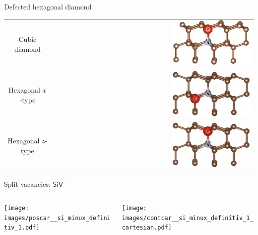 \documentclass[]{beamer}
\begin{document}
\begin{frame}{Defected hexagonal diamond}
  \begin{center}
    \begin{tabular}{cr}
      Cubic diamond   & \includegraphics[width=0.4\textwidth]{images/POSCAR_16_view.png}\\
      Hexagonal $ x $-type &\includegraphics[width=0.4\textwidth]{images/POSCAR_16_x_view.png}\\
      Hexagonal $ z $-type & \includegraphics[width=0.4\textwidth]{images/POSCAR_16_z_view.png}
    \end{tabular}
  \end{center}

\end{frame}



\begin{frame}{Split vacancies: $ \mathsf{SiV}^{-} $  }
  \def\splitTrim{6}
  \def\splitTrimVertical{2}
  \begin{columns}
    \begin{column}{0.5\textwidth}
      \texttt{[image: images/poscar\_\_si\_minux\_definitiv\_1.pdf]}
    \end{column}
    \begin{column}{0.5\textwidth}
      \texttt{[image: images/contcar\_\_si\_minux\_definitiv\_1\_cartesian.pdf]}
    \end{column}
  \end{columns}
\end{frame}
\end{document}

